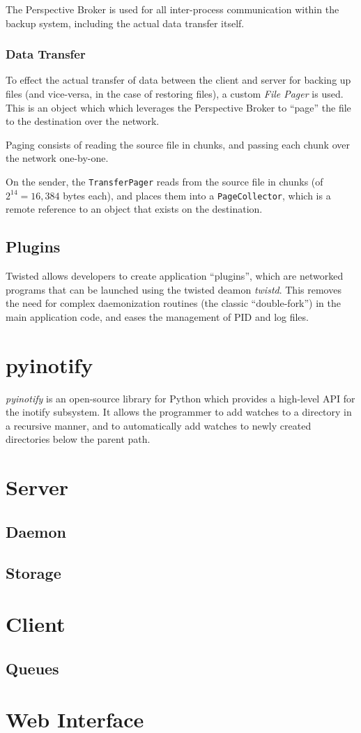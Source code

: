 The Perspective Broker is used for all inter-process communication within the
backup system, including the actual data transfer itself.

\subsubsection{Data Transfer}

To effect the actual transfer of data between the client and server for backing
up files (and vice-versa, in the case of restoring files), a custom \emph{File
Pager} is used. This is an object which which leverages the Perspective Broker
to ``page'' the file to the destination over the network.

Paging consists of reading the source file in chunks, and passing each chunk
over the network one-by-one.

On the sender, the \verb!TransferPager! reads from the source file in chunks
(of $2^{14} = 16,384$ bytes each), and places them into a \verb!PageCollector!,
which is a remote reference to an object that exists on the destination.

\subsection{Plugins}

Twisted allows developers to create application ``plugins'', which are
networked programs that can be launched using the twisted deamon \emph{twistd}.
This removes the need for complex daemonization routines (the classic
``double-fork'') in the main application code, and eases the management of PID
and log files.

\section{pyinotify}

\emph{pyinotify} is an open-source library for Python which provides
a high-level API for the inotify subsystem. It allows the programmer to add
watches to a directory in a recursive manner, and to automatically add watches
to newly created directories below the parent path.

\section{Server}

\subsection{Daemon}

\subsection{Storage}

\section{Client}

\subsection{Queues}

\section{Web Interface}
\label{sec:impl-web-interface}
